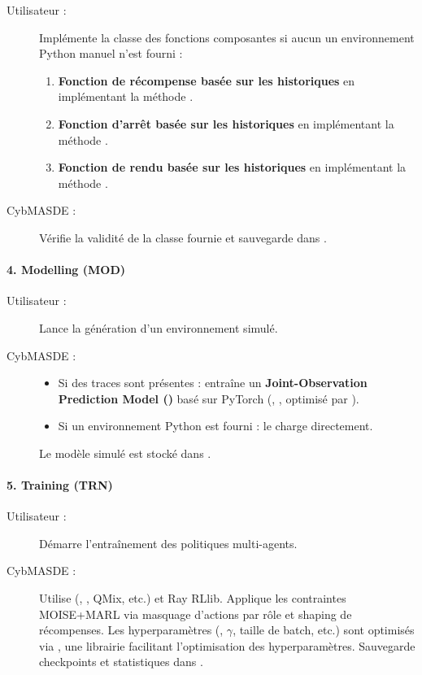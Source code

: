 \begin{description}
  \item[Utilisateur :] Implémente la classe des fonctions composantes si aucun un environnement Python manuel n'est fourni :
    \begin{enumerate}
      \item \textbf{Fonction de récompense basée sur les historiques} en implémentant la méthode .
      \item \textbf{Fonction d'arrêt basée sur les historiques} en implémentant la méthode .
      \item \textbf{Fonction de rendu basée sur les historiques} en implémentant la méthode .
    \end{enumerate}
  \item[CybMASDE :] Vérifie la validité de la classe fournie et sauvegarde dans .
\end{description}

\paragraph{4. Modelling (MOD)}
\begin{description}
  \item[Utilisateur :] Lance la génération d'un environnement simulé.
  \item[CybMASDE :]
    \begin{itemize}
      \item Si des traces sont présentes : entraîne un \textbf{Joint-Observation Prediction Model ()} basé sur PyTorch (, ,  optimisé par ).
      \item Si un environnement Python est fourni : le charge directement.
    \end{itemize}
    Le modèle simulé est stocké dans .
\end{description}

\paragraph{5. Training (TRN)}
\begin{description}
  \item[Utilisateur :] Démarre l'entraînement des politiques multi-agents.
  \item[CybMASDE :] Utilise  (, , QMix, etc.) et Ray RLlib. Applique les contraintes MOISE+MARL via masquage d'actions par rôle et shaping de récompenses. Les hyperparamètres (, $\gamma$, taille de batch, etc.) sont optimisés via , une librairie facilitant l'optimisation des hyperparamètres. Sauvegarde checkpoints et statistiques dans .
\end{description}

